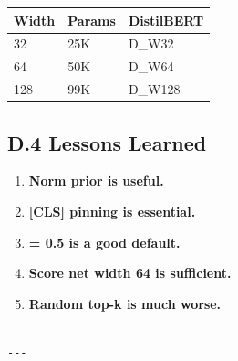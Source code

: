 \begin{table}[H]
\centering
\small
\begin{tabular}{lll}
\toprule
\textbf{Width} & \textbf{Params} & \textbf{DistilBERT} \\
\midrule
32 & 25K & {{D\_W32}} \\
64 & 50K & {{D\_W64}} \\
128 & 99K & {{D\_W128}} \\
\bottomrule
\end{tabular}
\end{table}

\subsection{D.4 Lessons Learned}

\begin{enumerate}
\item \textbf{Norm prior is useful.}
\item \textbf{[CLS] pinning is essential.}
\item \textbf{  = 0.5 is a good default.}
\item \textbf{Score net width 64 is sufficient.}
\item \textbf{Random top-k is much worse.}
\end{enumerate}
\begin{lstlisting}

---
\end{lstlisting}